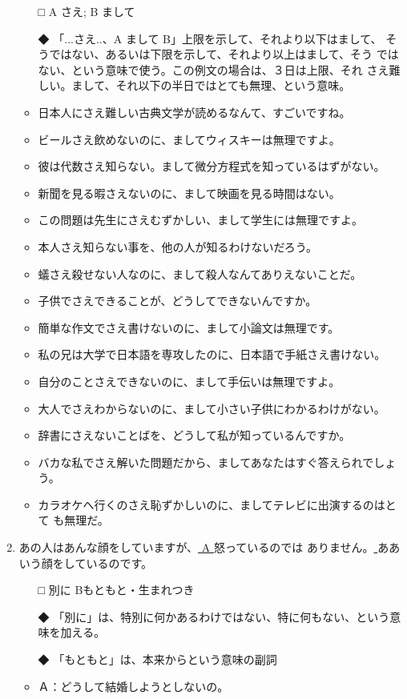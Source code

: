 \documentclass[
uplatex,
b5paper,
10pt,
dvipdfmx
]{jsbook}
\begin{document}
\begin{enumerate}
\begin{itemize}
\itemsep=-4pt
\item[□] A さえ; B まして
\item[◆] 「...さえ..、A まして B」上限を示して、それより以下はまして、
	  そうではない、あるいは下限を示して、それより以上はまして、そう
	  ではない、という意味で使う。この例文の場合は、３日は上限、それ
	  さえ難しい。まして、それ以下の半日ではとても無理、という意味。
\end{itemize}
\begin{itemize}
\item 日本人にさえ難しい古典文学が読めるなんて、すごいですね。
\item ビールさえ飲めないのに、ましてウィスキーは無理ですよ。
\item 彼は代数さえ知らない。まして微分方程式を知っているはずがない。
\item 新聞を見る暇さえないのに、まして映画を見る時間はない。
\item この問題は先生にさえむずかしい、まして学生には無理ですよ。
\item 本人さえ知らない事を、他の人が知るわけないだろう。
\item 蟻さえ殺せない人なのに、まして殺人なんてありえないことだ。
\item 子供でさえできることが、どうしてできないんですか。
\item 簡単な作文でさえ書けないのに、まして小論文は無理です。
\item 私の兄は大学で日本語を専攻したのに、日本語で手紙さえ書けない。
\item 自分のことさえできないのに、まして手伝いは無理ですよ。
\item 大人でさえわからないのに、まして小さい子供にわかるわけがない。
\item 辞書にさえないことばを、どうして私が知っているんですか。
\item バカな私でさえ解いた問題だから、ましてあなたはすぐ答えられでしょう。
\item カラオケへ行くのさえ恥ずかしいのに、ましてテレビに出演するのはとて
      も無理だ。
\end{itemize}

\item あの人はあんな顔をしていますが、\underline{ A }怒っているのでは
      ありません。\underline{    }ああいう顔をしているのです。
\begin{itemize}
\item[□] 別に Bもともと・生まれつき
\item[◆] 「別に」は、特別に何かあるわけではない、特に何もない、という意
	  味を加える。
\item[◆] 「もともと」は、本来からという意味の副詞
\end{itemize}
\begin{itemize}
\item Ａ：どうして結婚しようとしないの。


\end{itemize}
\end{enumerate}
\end{document}
